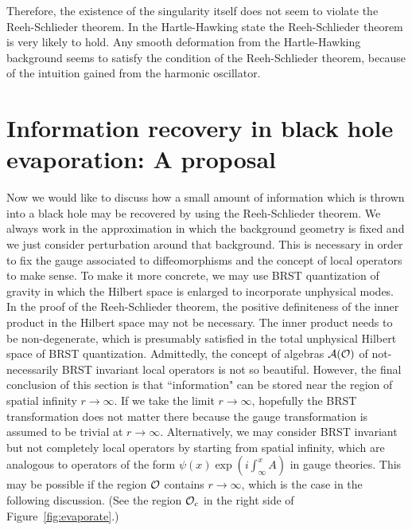 \documentclass[12pt,a4paper]{article}
\theoremstyle{plain}
\theoremstyle{definition}
\numberwithin{thm}{section}
\def\CA{{\cal A}}
\def\CO{{\cal O}}
\begin{document}
Therefore, the existence of the singularity itself does not seem to violate the Reeh-Schlieder theorem.
In the Hartle-Hawking state the Reeh-Schlieder theorem is very likely to hold.
Any smooth deformation from the Hartle-Hawking background seems to satisfy the condition of the Reeh-Schlieder theorem,
because of the intuition gained from the harmonic oscillator. 








\section{Information recovery in black hole evaporation: A proposal}
Now we would like to discuss how a small amount of information which is thrown into a black hole may be recovered by using the Reeh-Schlieder theorem.
We always work in the approximation in which the background geometry is fixed and we just consider perturbation around that background.
This is necessary in order to fix the gauge associated to diffeomorphisms and the concept of local operators to make sense. %
To make it more concrete, we may use BRST quantization of gravity in which the Hilbert space is enlarged to incorporate unphysical modes. In the proof of the Reeh-Schlieder theorem,
the positive definiteness of the inner product in the Hilbert space may not be necessary. The inner product needs to be non-degenerate, which is presumably 
satisfied in the total unphysical Hilbert space of BRST quantization. Admittedly, the concept of algebras $\CA(\CO)$ of
not-necessarily BRST invariant local operators is not so beautiful. However, the final conclusion of this section is that ``information" can be stored near the region 
of spatial infinity $r \to \infty$. If we take the limit $r \to \infty$, hopefully the BRST transformation does not matter there because the gauge transformation
is assumed to be trivial at $r \to \infty$. Alternatively, we may consider BRST invariant but not completely local operators by starting from spatial infinity,
which are analogous to operators of the form $\psi(x) \exp( i \int^x_\infty A)$ in gauge theories. This may be possible if the region $\CO$ contains $r \to \infty$, which is the case
in the following discussion. (See the region $\CO_c$ in the right side of Figure~\ref{fig:evaporate}.)
\end{document}

